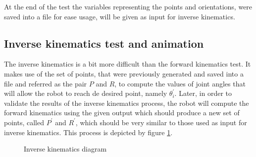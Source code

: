 \documentclass{article}
\begin{document}
At the end of the test the variables representing the points and orientations, were saved into a file for ease usage, will be given as input for inverse kinematics. 

\subsection{Inverse kinematics test and animation}
The inverse kinematics is a bit more difficult than the forward kinematics test. It makes use of the set of points, that were previously generated and saved into a file and referred as the pair $P$ and $R$, to compute the values of joint angles that will allow the robot to reach de desired point, namely $\theta_i^{\prime}$. Later, in order to validate the results of the inverse kinematics process, the robot will compute the forward kinematics using the given output which should produce a new set of points, called $P^{\prime}$ and $R^{\prime}$, which should be very similar to those used as input for inverse kinematics. This process is depicted by figure \ref{fig:inverse_test.diagram}.

\begin{figure}
\begin{center}
\caption{Inverse kinematics diagram}
\label{fig:inverse_test.diagram}
\end{center}
\end{figure}
\end{document}
